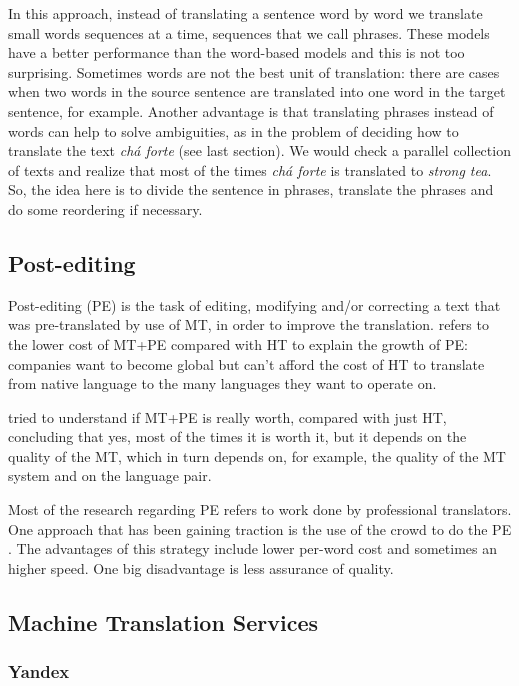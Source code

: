 In this approach, instead of translating a sentence word by word we translate small words sequences at a time, sequences that we call phrases. These models have a better performance than the word-based models and this is not too surprising. Sometimes words are not the best unit of translation: there are cases when two words in the source sentence are translated into one word in the target sentence, for example. Another advantage is that translating phrases instead of words can help to solve ambiguities, as in the problem of deciding how to translate the text \textit{chá forte} (see last section). We would check a parallel collection of texts and realize that most of the times \textit{chá forte} is translated to \textit{strong tea}. So, the idea here is to divide the sentence in phrases, translate the phrases and do some reordering if necessary.  

\subsection{Post-editing}

Post-editing (PE) is the task of editing, modifying and/or correcting a text that was pre-translated by use of MT, in order to improve the translation. \citep{Somers2003} refers to the lower cost of MT+PE compared with HT to explain the growth of PE: companies want to become global but can't afford the cost of HT to translate from native language to the many languages they want to operate on.

\citep{Koponen2016a} tried to understand if MT+PE is really worth, compared with just HT, concluding that yes, most of the times it is worth it, but it depends on the quality of the MT, which in turn depends on, for example, the quality of the MT system and on the language pair. 

Most of the research regarding PE refers to work done by professional translators. One approach that has been gaining traction is the use of the crowd to do the PE \citep{Tatsumi2012a}. The advantages of this strategy include lower per-word cost and sometimes an higher speed. One big disadvantage is less assurance of quality. 

\subsection{Machine Translation Services}

\subsubsection{Yandex}

